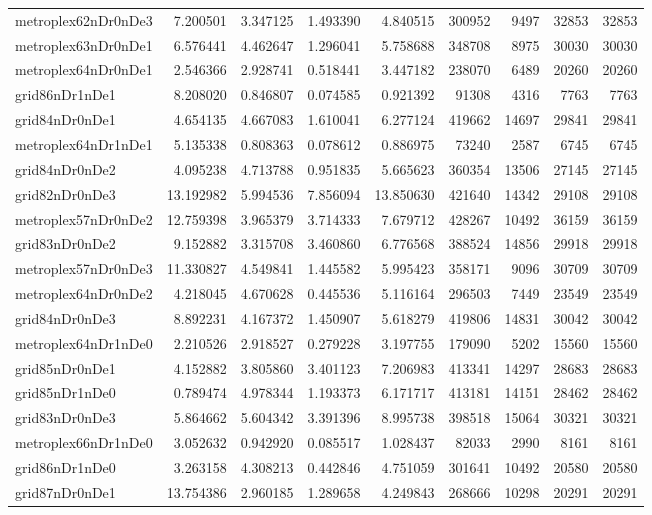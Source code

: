 \begin{longtable}{|l|r|r|r|r|r|r|r|r|}
metroplex62nDr0nDe3 & 7.200501 & 3.347125 & 1.493390 & 4.840515 & 300952 & 9497 & 32853 & 32853 \\
metroplex63nDr0nDe1 & 6.576441 & 4.462647 & 1.296041 & 5.758688 & 348708 & 8975 & 30030 & 30030 \\
metroplex64nDr0nDe1 & 2.546366 & 2.928741 & 0.518441 & 3.447182 & 238070 & 6489 & 20260 & 20260 \\
grid86nDr1nDe1 & 8.208020 & 0.846807 & 0.074585 & 0.921392 & 91308 & 4316 & 7763 & 7763 \\
grid84nDr0nDe1 & 4.654135 & 4.667083 & 1.610041 & 6.277124 & 419662 & 14697 & 29841 & 29841 \\
metroplex64nDr1nDe1 & 5.135338 & 0.808363 & 0.078612 & 0.886975 & 73240 & 2587 & 6745 & 6745 \\
grid84nDr0nDe2 & 4.095238 & 4.713788 & 0.951835 & 5.665623 & 360354 & 13506 & 27145 & 27145 \\
grid82nDr0nDe3 & 13.192982 & 5.994536 & 7.856094 & 13.850630 & 421640 & 14342 & 29108 & 29108 \\
metroplex57nDr0nDe2 & 12.759398 & 3.965379 & 3.714333 & 7.679712 & 428267 & 10492 & 36159 & 36159 \\
grid83nDr0nDe2 & 9.152882 & 3.315708 & 3.460860 & 6.776568 & 388524 & 14856 & 29918 & 29918 \\
metroplex57nDr0nDe3 & 11.330827 & 4.549841 & 1.445582 & 5.995423 & 358171 & 9096 & 30709 & 30709 \\
metroplex64nDr0nDe2 & 4.218045 & 4.670628 & 0.445536 & 5.116164 & 296503 & 7449 & 23549 & 23549 \\
grid84nDr0nDe3 & 8.892231 & 4.167372 & 1.450907 & 5.618279 & 419806 & 14831 & 30042 & 30042 \\
metroplex64nDr1nDe0 & 2.210526 & 2.918527 & 0.279228 & 3.197755 & 179090 & 5202 & 15560 & 15560 \\
grid85nDr0nDe1 & 4.152882 & 3.805860 & 3.401123 & 7.206983 & 413341 & 14297 & 28683 & 28683 \\
grid85nDr1nDe0 & 0.789474 & 4.978344 & 1.193373 & 6.171717 & 413181 & 14151 & 28462 & 28462 \\
grid83nDr0nDe3 & 5.864662 & 5.604342 & 3.391396 & 8.995738 & 398518 & 15064 & 30321 & 30321 \\
metroplex66nDr1nDe0 & 3.052632 & 0.942920 & 0.085517 & 1.028437 & 82033 & 2990 & 8161 & 8161 \\
grid86nDr1nDe0 & 3.263158 & 4.308213 & 0.442846 & 4.751059 & 301641 & 10492 & 20580 & 20580 \\
grid87nDr0nDe1 & 13.754386 & 2.960185 & 1.289658 & 4.249843 & 268666 & 10298 & 20291 & 20291 \\

\end{longtable}
